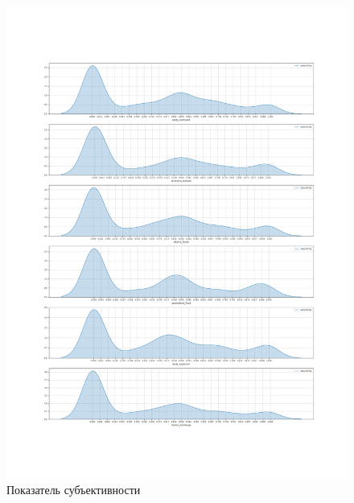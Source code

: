 \documentclass[11pt]{article}
\begin{document}
\begin{figure}
\centering
\includegraphics[width=\textwidth]{subjectivity.png}
\caption{Показатель субъективности}\label{subjectivity}
\end{figure}
\end{document}

